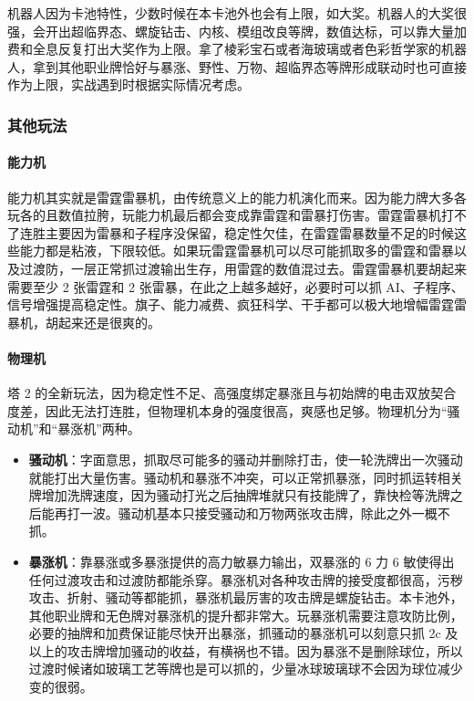 ﻿\documentclass[12pt, a4paper]{article}
\begin{document}
机器人因为卡池特性，少数时候在本卡池外也会有上限，如大奖。机器人的大奖很强，会开出超临界态、螺旋钻击、内核、模组改良等牌，数值达标，可以靠大量加费和全息反复打出大奖作为上限。拿了棱彩宝石或者海玻璃或者色彩哲学家的机器人，拿到其他职业牌恰好与暴涨、野性、万物、超临界态等牌形成联动时也可直接作为上限，实战遇到时根据实际情况考虑。

\subsubsection{其他玩法}

\paragraph{能力机}
能力机其实就是雷霆雷暴机，由传统意义上的能力机演化而来。因为能力牌大多各玩各的且数值拉胯，玩能力机最后都会变成靠雷霆和雷暴打伤害。雷霆雷暴机打不了连胜主要因为雷暴和子程序没保留，稳定性欠佳，在雷霆雷暴数量不足的时候这些能力都是粘液，下限较低。如果玩雷霆雷暴机可以尽可能抓取多的雷霆和雷暴以及过渡防，一层正常抓过渡输出生存，用雷霆的数值混过去。雷霆雷暴机要胡起来需要至少 2 张雷霆和 2 张雷暴，在此之上越多越好，必要时可以抓 AI、子程序、信号增强提高稳定性。旗子、能力减费、疯狂科学、干手都可以极大地增幅雷霆雷暴机，胡起来还是很爽的。

\paragraph{物理机}
塔 2 的全新玩法，因为稳定性不足、高强度绑定暴涨且与初始牌的电击双放契合度差，因此无法打连胜，但物理机本身的强度很高，爽感也足够。物理机分为“骚动机”和“暴涨机”两种。
\begin{itemize}
    \item \textbf{骚动机}：字面意思，抓取尽可能多的骚动并删除打击，使一轮洗牌出一次骚动就能打出大量伤害。骚动机和暴涨不冲突，可以正常抓暴涨，同时抓运转相关牌增加洗牌速度，因为骚动打光之后抽牌堆就只有技能牌了，靠快检等洗牌之后能再打一波。骚动机基本只接受骚动和万物两张攻击牌，除此之外一概不抓。
    \item \textbf{暴涨机}：靠暴涨或多暴涨提供的高力敏暴力输出，双暴涨的 6 力 6 敏使得出任何过渡攻击和过渡防都能杀穿。暴涨机对各种攻击牌的接受度都很高，污秽攻击、折射、骚动等都能抓，暴涨机最厉害的攻击牌是螺旋钻击。本卡池外，其他职业牌和无色牌对暴涨机的提升都非常大。玩暴涨机需要注意攻防比例，必要的抽牌和加费保证能尽快开出暴涨，抓骚动的暴涨机可以刻意只抓 2c 及以上的攻击牌增加骚动的收益，有横祸也不错。因为暴涨不是删除球位，所以过渡时候诸如玻璃工艺等牌也是可以抓的，少量冰球玻璃球不会因为球位减少变的很弱。
\end{itemize}
\end{document}
